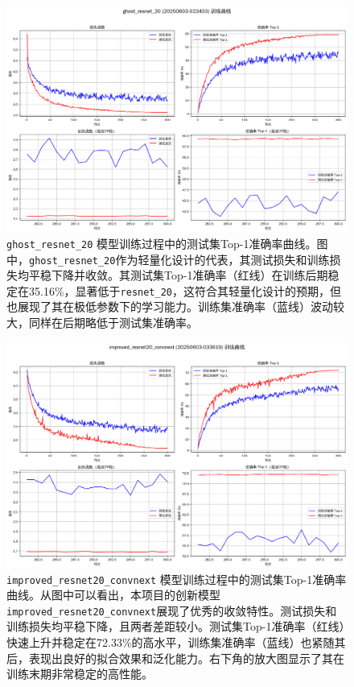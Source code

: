 \documentclass[a4paper]{article}
\begin{document}
\begin{description}
\begin{figure}[H]
    \centering
    \includegraphics[width=\textwidth]{training_curves_ghost_resnet_20.png}
    \caption{\texttt{ghost\_resnet\_20} 模型训练过程中的测试集Top-1准确率曲线。图中，\texttt{ghost\_resnet\_20}作为轻量化设计的代表，其测试损失和训练损失均平稳下降并收敛。其测试集Top-1准确率（红线）在训练后期稳定在35.16\%，显著低于\texttt{resnet\_20}，这符合其轻量化设计的预期，但也展现了其在极低参数下的学习能力。训练集准确率（蓝线）波动较大，同样在后期略低于测试集准确率。}
    \label{fig:train_curve_ghostresnet20}
\end{figure}

\begin{figure}[H]
    \centering
    \includegraphics[width=\textwidth]{training_curves_improved_resnet20_convnext.png}
    \caption{\texttt{improved\_resnet20\_convnext} 模型训练过程中的测试集Top-1准确率曲线。从图中可以看出，本项目的创新模型\texttt{improved\_resnet20\_convnext}展现了优秀的收敛特性。测试损失和训练损失均平稳下降，且两者差距较小。测试集Top-1准确率（红线）快速上升并稳定在72.33\%的高水平，训练集准确率（蓝线）也紧随其后，表现出良好的拟合效果和泛化能力。右下角的放大图显示了其在训练末期非常稳定的高性能。}
    \label{fig:train_curve_improved}
\end{figure}


\end{description}
\end{document}
